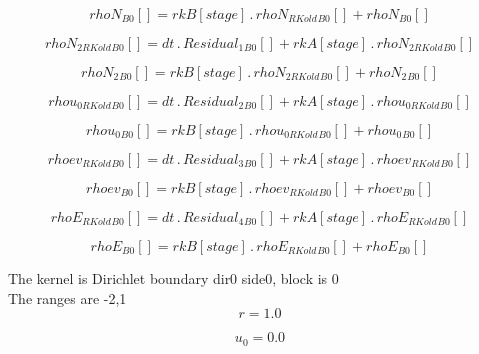 \documentclass{article}
\begin{document}
\begin{dmath}{rhoN{_{B0}}}[{}] = {rkB}[{stage}] \,.\, {rhoN_{RKold}{_{B0}}}[{}] + {rhoN{_{B0}}}[{}]\end{dmath}

\begin{dmath}{rhoN_{2 RKold}{_{B0}}}[{}] = dt \,.\, {Residual_{1}{_{B0}}}[{}] + {rkA}[{stage}] \,.\, {rhoN_{2 RKold}{_{B0}}}[{}]\end{dmath}

\begin{dmath}{rhoN_{2}{_{B0}}}[{}] = {rkB}[{stage}] \,.\, {rhoN_{2 RKold}{_{B0}}}[{}] + {rhoN_{2}{_{B0}}}[{}]\end{dmath}

\begin{dmath}{rhou_{0 RKold}{_{B0}}}[{}] = dt \,.\, {Residual_{2}{_{B0}}}[{}] + {rkA}[{stage}] \,.\, {rhou_{0 RKold}{_{B0}}}[{}]\end{dmath}

\begin{dmath}{rhou_{0}{_{B0}}}[{}] = {rkB}[{stage}] \,.\, {rhou_{0 RKold}{_{B0}}}[{}] + {rhou_{0}{_{B0}}}[{}]\end{dmath}

\begin{dmath}{rhoev_{RKold}{_{B0}}}[{}] = dt \,.\, {Residual_{3}{_{B0}}}[{}] + {rkA}[{stage}] \,.\, {rhoev_{RKold}{_{B0}}}[{}]\end{dmath}

\begin{dmath}{rhoev{_{B0}}}[{}] = {rkB}[{stage}] \,.\, {rhoev_{RKold}{_{B0}}}[{}] + {rhoev{_{B0}}}[{}]\end{dmath}

\begin{dmath}{rhoE_{RKold}{_{B0}}}[{}] = dt \,.\, {Residual_{4}{_{B0}}}[{}] + {rkA}[{stage}] \,.\, {rhoE_{RKold}{_{B0}}}[{}]\end{dmath}

\begin{dmath}{rhoE{_{B0}}}[{}] = {rkB}[{stage}] \,.\, {rhoE_{RKold}{_{B0}}}[{}] + {rhoE{_{B0}}}[{}]\end{dmath}

\noindent The kernel is Dirichlet boundary dir0 side0, block is 0\\\noindent The ranges are -2,1\\\begin{dmath}r = 1.0\end{dmath}

\begin{dmath}u_{0} = 0.0\end{dmath}
\end{document}
